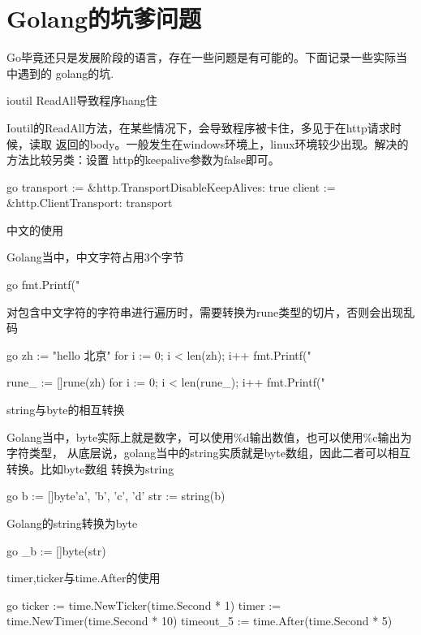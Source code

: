 \section{Golang的坑爹问题}
Go毕竟还只是发展阶段的语言，存在一些问题是有可能的。下面记录一些实际当中遇到的
golang的坑.
\begin{outline}[enumerate]

  \1 ioutil ReadAll导致程序hang住

  Ioutil的ReadAll方法，在某些情况下，会导致程序被卡住，多见于在http请求时候，读取
  返回的body。一般发生在windows环境上，linux环境较少出现。解决的方法比较另类：设置
  http的keepalive参数为false即可。
\begin{code-block}{go}
transport := &http.Transport{DisableKeepAlives: true}
client := &http.Client{Transport: transport}
\end{code-block}

  \1 中文的使用

  Golang当中，中文字符占用3个字节
\begin{code-block}{go}
fmt.Printf("%
\end{code-block}

  对包含中文字符的字符串进行遍历时，需要转换为rune类型的切片，否则会出现乱码
\begin{code-block}{go}
zh := "hello 北京"
for i := 0; i < len(zh); i++ {
    fmt.Printf("%
}

rune_ := []rune(zh)
for i := 0; i < len(rune_); i++ {
    fmt.Printf("%
}
\end{code-block}

  \1 string与byte的相互转换

  Golang当中，byte实际上就是数字，可以使用\%d输出数值，也可以使用\%c输出为字符类型，
  从底层说，golang当中的string实质就是byte数组，因此二者可以相互转换。比如byte数组
  转换为string
\begin{code-block}{go}
b := []byte{'a', 'b', 'c', 'd'}
str := string(b)
\end{code-block}

  Golang的string转换为byte
\begin{code-block}{go}
_b := []byte(str)
\end{code-block}

  \1 timer,ticker与time.After的使用

\begin{code-block}{go}
ticker := time.NewTicker(time.Second * 1)
timer := time.NewTimer(time.Second * 10)
timeout_5 := time.After(time.Second * 5)


\end{code-block}
\end{outline}
